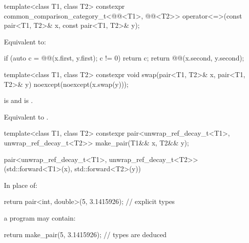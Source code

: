 %
\begin{itemdecl}
template<class T1, class T2>
  constexpr common_comparison_category_t<@@<T1>,
                                         @@<T2>>
    operator<=>(const pair<T1, T2>& x, const pair<T1, T2>& y);
\end{itemdecl}

\begin{itemdescr}
\pnum
\effects
Equivalent to:
\begin{codeblock}
if (auto c = @@(x.first, y.first); c != 0) return c;
return @@(x.second, y.second);
\end{codeblock}
\end{itemdescr}

%
\begin{itemdecl}
template<class T1, class T2>
  constexpr void swap(pair<T1, T2>& x, pair<T1, T2>& y) noexcept(noexcept(x.swap(y)));
\end{itemdecl}

\begin{itemdescr}
\pnum
\constraints
{} is  and
 is .

\pnum
\effects
Equivalent to .
\end{itemdescr}

%
\begin{itemdecl}
template<class T1, class T2>
  constexpr pair<unwrap_ref_decay_t<T1>, unwrap_ref_decay_t<T2>> make_pair(T1&& x, T2&& y);
\end{itemdecl}

\begin{itemdescr}
\pnum
\returns
\begin{codeblock}
pair<unwrap_ref_decay_t<T1>,
     unwrap_ref_decay_t<T2>>(std::forward<T1>(x), std::forward<T2>(y))
\end{codeblock}
\end{itemdescr}

\pnum
\begin{example}
In place of:
\begin{codeblock}
return pair<int, double>(5, 3.1415926);     // explicit types
\end{codeblock}
a \Cpp{} program may contain:
\begin{codeblock}
return make_pair(5, 3.1415926);             // types are deduced
\end{codeblock}
\end{example}

